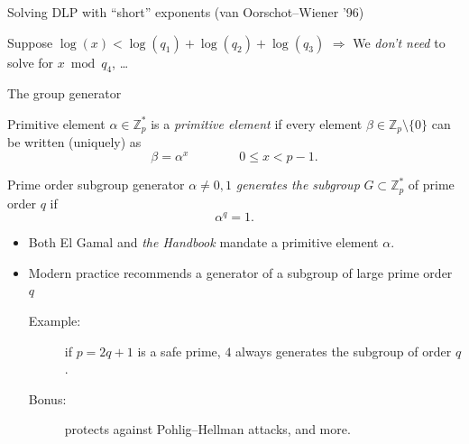 \documentclass[aspectratio=169]{beamer}
\newcommand{\Z}{\mathbb{Z}}
\begin{document}
\begin{frame}{Solving DLP with ``short'' exponents (van Oorschot--Wiener '96)}
  \begin{block}{}
    \centering
  \end{block}

  \bigskip
  
  Suppose \emph{$\log(x) < \log(q_1) + \log(q_2) + \log(q_3)$} $\Rightarrow$
  We \emph{don't need} to solve for \emph{$x\bmod q_4$}, \dots
\end{frame}


\begin{frame}{The group generator}
  \begin{block}{Primitive element}
    $\alpha\in\Z_p^*$ is a \emph{primitive element} if every element 
    $\beta\in\Z_p\setminus\{0\}$ can be written (uniquely) as
    \[\beta = \alpha^x \qquad\qquad 0\le x < p-1.\]
  \end{block}

  \begin{block}{Prime order subgroup generator}
    $\alpha\ne 0,1$ \emph{generates the subgroup} $G\subset\Z_p^*$
    of prime order $q$ if
    \[\alpha^q = 1.\]
  \end{block}

  \begin{itemize}
  \item Both El Gamal and {\it the Handbook} mandate a primitive
    element $\alpha$.
  \item Modern practice recommends a generator of a
    subgroup of large prime order $q$
    \begin{description}
    \item[Example:] if $p = 2q + 1$ is a safe prime, $4$ 
      always generates the subgroup of order $q$.
    \item[Bonus:] protects against Pohlig--Hellman attacks, and more.
    \end{description}
  \end{itemize}
\end{frame}
\end{document}
